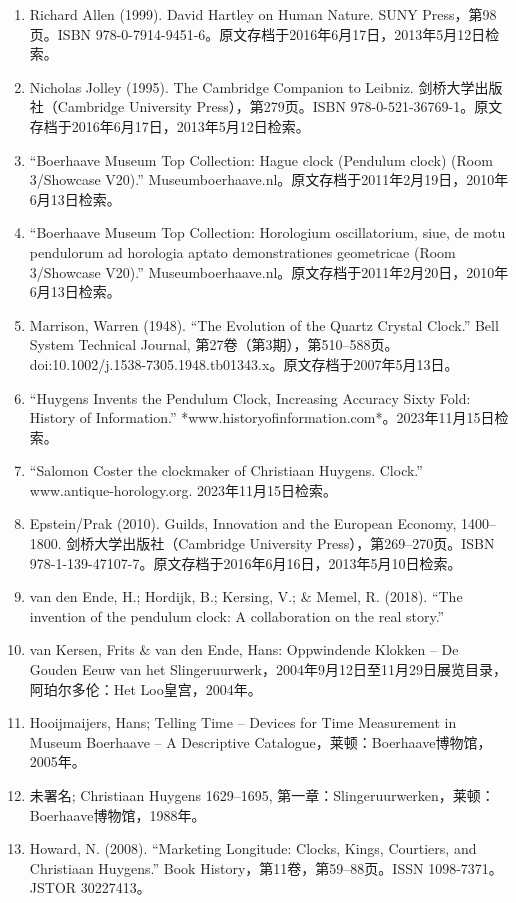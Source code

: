 \begin{enumerate}
\item Richard Allen (1999). David Hartley on Human Nature. SUNY Press，第98页。ISBN 978-0-7914-9451-6。原文存档于2016年6月17日，2013年5月12日检索。
\item Nicholas Jolley (1995). The Cambridge Companion to Leibniz. 剑桥大学出版社（Cambridge University Press），第279页。ISBN 978-0-521-36769-1。原文存档于2016年6月17日，2013年5月12日检索。
\item “Boerhaave Museum Top Collection: Hague clock (Pendulum clock) (Room 3/Showcase V20).” Museumboerhaave.nl。原文存档于2011年2月19日，2010年6月13日检索。
\item “Boerhaave Museum Top Collection: Horologium oscillatorium, siue, de motu pendulorum ad horologia aptato demonstrationes geometricae (Room 3/Showcase V20).” Museumboerhaave.nl。原文存档于2011年2月20日，2010年6月13日检索。
\item Marrison, Warren (1948). “The Evolution of the Quartz Crystal Clock.” Bell System Technical Journal, 第27卷（第3期），第510–588页。doi:10.1002/j.1538-7305.1948.tb01343.x。原文存档于2007年5月13日。
\item “Huygens Invents the Pendulum Clock, Increasing Accuracy Sixty Fold: History of Information.” *www.historyofinformation.com*。2023年11月15日检索。
\item “Salomon Coster the clockmaker of Christiaan Huygens. Clock.” www.antique-horology.org. 2023年11月15日检索。
\item Epstein/Prak (2010). Guilds, Innovation and the European Economy, 1400–1800. 剑桥大学出版社（Cambridge University Press），第269–270页。ISBN 978-1-139-47107-7。原文存档于2016年6月16日，2013年5月10日检索。
\item van den Ende, H.; Hordijk, B.; Kersing, V.; & Memel, R. (2018). “The invention of the pendulum clock: A collaboration on the real story.”
\item van Kersen, Frits & van den Ende, Hans: Oppwindende Klokken – De Gouden Eeuw van het Slingeruurwerk，2004年9月12日至11月29日展览目录，阿珀尔多伦：Het Loo皇宫，2004年。
\item Hooijmaijers, Hans; Telling Time – Devices for Time Measurement in Museum Boerhaave – A Descriptive Catalogue，莱顿：Boerhaave博物馆，2005年。
\item 未署名; Christiaan Huygens 1629–1695, 第一章：Slingeruurwerken，莱顿：Boerhaave博物馆，1988年。
\item Howard, N. (2008). “Marketing Longitude: Clocks, Kings, Courtiers, and Christiaan Huygens.” Book History，第11卷，第59–88页。ISSN 1098-7371。JSTOR 30227413。










\end{enumerate}


